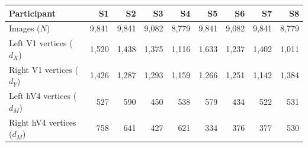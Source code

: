 \begin{tabular}{lrrrrrrrr}
\toprule
Participant & S1 & S2 & S3 & S4 & S5 & S6 & S7 & S8 \\
\midrule
Images ($N$) & 9,841 & 9,841 & 9,082 & 8,779 & 9,841 & 9,082 & 9,841 & 8,779 \\
Left V1 vertices ($d_{X}$) & 1,520 & 1,438 & 1,375 & 1,116 & 1,633 & 1,237 & 1,402 & 1,011 \\
Right V1 vertices ($d_{Y}$) & 1,426 & 1,287 & 1,293 & 1,159 & 1,266 & 1,251 & 1,142 & 1,384 \\
Left hV4 vertices ($d_{M}$) & 527 & 590 & 450 & 538 & 579 & 434 & 522 & 531 \\
Right hV4 vertices ($d_{M}$) & 758 & 641 & 427 & 621 & 334 & 376 & 377 & 530 \\
\bottomrule
\end{tabular}
